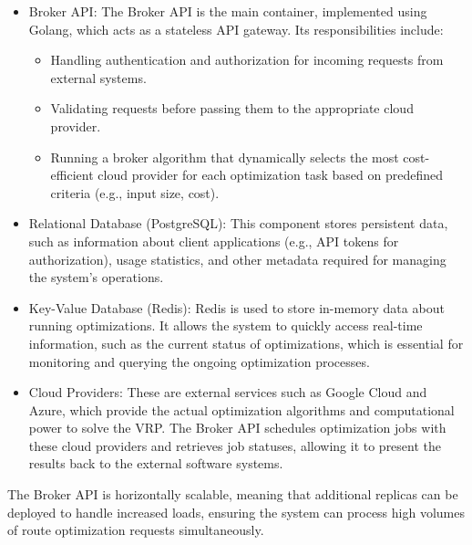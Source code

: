 \documentclass[english,notblind]{sbc20}
\begin{document}
\begin{itemize}
  \item Broker API: The Broker API is the main container, implemented using Golang, which acts as a stateless API gateway. Its responsibilities include:
        \begin{itemize}
          \item Handling authentication and authorization for incoming requests from external systems.
          \item Validating requests before passing them to the appropriate cloud provider.
          \item Running a broker algorithm that dynamically selects the most cost-efficient cloud provider for each optimization task based on predefined criteria (e.g., input size, cost).
        \end{itemize}

  \item Relational Database (PostgreSQL): This component stores persistent data, such as information about client applications (e.g., API tokens for authorization), usage statistics, and other metadata required for managing the system's operations.

  \item Key-Value Database (Redis): Redis is used to store in-memory data about running optimizations. It allows the system to quickly access real-time information, such as the current status of optimizations, which is essential for monitoring and querying the ongoing optimization processes.

  \item Cloud Providers: These are external services such as Google Cloud and Azure, which provide the actual optimization algorithms and computational power to solve the VRP. The Broker API schedules optimization jobs with these cloud providers and retrieves job statuses, allowing it to present the results back to the external software systems.
\end{itemize}

The Broker API is horizontally scalable, meaning that additional replicas can be deployed to handle increased loads, ensuring the system can process high volumes of route optimization requests simultaneously.
\end{document}
